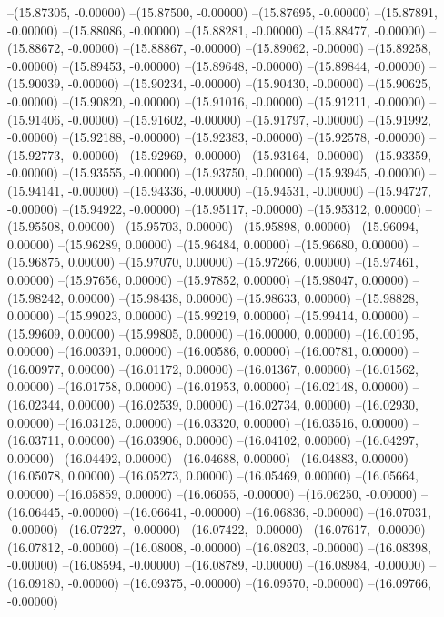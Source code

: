 --(15.87305, -0.00000)
--(15.87500, -0.00000)
--(15.87695, -0.00000)
--(15.87891, -0.00000)
--(15.88086, -0.00000)
--(15.88281, -0.00000)
--(15.88477, -0.00000)
--(15.88672, -0.00000)
--(15.88867, -0.00000)
--(15.89062, -0.00000)
--(15.89258, -0.00000)
--(15.89453, -0.00000)
--(15.89648, -0.00000)
--(15.89844, -0.00000)
--(15.90039, -0.00000)
--(15.90234, -0.00000)
--(15.90430, -0.00000)
--(15.90625, -0.00000)
--(15.90820, -0.00000)
--(15.91016, -0.00000)
--(15.91211, -0.00000)
--(15.91406, -0.00000)
--(15.91602, -0.00000)
--(15.91797, -0.00000)
--(15.91992, -0.00000)
--(15.92188, -0.00000)
--(15.92383, -0.00000)
--(15.92578, -0.00000)
--(15.92773, -0.00000)
--(15.92969, -0.00000)
--(15.93164, -0.00000)
--(15.93359, -0.00000)
--(15.93555, -0.00000)
--(15.93750, -0.00000)
--(15.93945, -0.00000)
--(15.94141, -0.00000)
--(15.94336, -0.00000)
--(15.94531, -0.00000)
--(15.94727, -0.00000)
--(15.94922, -0.00000)
--(15.95117, -0.00000)
--(15.95312, 0.00000)
--(15.95508, 0.00000)
--(15.95703, 0.00000)
--(15.95898, 0.00000)
--(15.96094, 0.00000)
--(15.96289, 0.00000)
--(15.96484, 0.00000)
--(15.96680, 0.00000)
--(15.96875, 0.00000)
--(15.97070, 0.00000)
--(15.97266, 0.00000)
--(15.97461, 0.00000)
--(15.97656, 0.00000)
--(15.97852, 0.00000)
--(15.98047, 0.00000)
--(15.98242, 0.00000)
--(15.98438, 0.00000)
--(15.98633, 0.00000)
--(15.98828, 0.00000)
--(15.99023, 0.00000)
--(15.99219, 0.00000)
--(15.99414, 0.00000)
--(15.99609, 0.00000)
--(15.99805, 0.00000)
--(16.00000, 0.00000)
--(16.00195, 0.00000)
--(16.00391, 0.00000)
--(16.00586, 0.00000)
--(16.00781, 0.00000)
--(16.00977, 0.00000)
--(16.01172, 0.00000)
--(16.01367, 0.00000)
--(16.01562, 0.00000)
--(16.01758, 0.00000)
--(16.01953, 0.00000)
--(16.02148, 0.00000)
--(16.02344, 0.00000)
--(16.02539, 0.00000)
--(16.02734, 0.00000)
--(16.02930, 0.00000)
--(16.03125, 0.00000)
--(16.03320, 0.00000)
--(16.03516, 0.00000)
--(16.03711, 0.00000)
--(16.03906, 0.00000)
--(16.04102, 0.00000)
--(16.04297, 0.00000)
--(16.04492, 0.00000)
--(16.04688, 0.00000)
--(16.04883, 0.00000)
--(16.05078, 0.00000)
--(16.05273, 0.00000)
--(16.05469, 0.00000)
--(16.05664, 0.00000)
--(16.05859, 0.00000)
--(16.06055, -0.00000)
--(16.06250, -0.00000)
--(16.06445, -0.00000)
--(16.06641, -0.00000)
--(16.06836, -0.00000)
--(16.07031, -0.00000)
--(16.07227, -0.00000)
--(16.07422, -0.00000)
--(16.07617, -0.00000)
--(16.07812, -0.00000)
--(16.08008, -0.00000)
--(16.08203, -0.00000)
--(16.08398, -0.00000)
--(16.08594, -0.00000)
--(16.08789, -0.00000)
--(16.08984, -0.00000)
--(16.09180, -0.00000)
--(16.09375, -0.00000)
--(16.09570, -0.00000)
--(16.09766, -0.00000)
